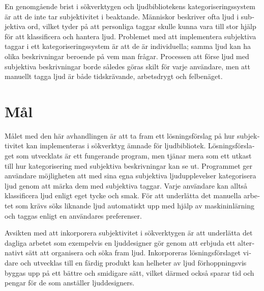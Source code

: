 \begin{otherlanguage}{swedish}
    En genomgående brist i sökverktygen och ljudbibliotekens kategoriseringssystem är att de inte tar subjektivitet i beaktande. Människor beskriver ofta ljud i subjektiva ord, vilket tyder på att personliga taggar skulle kunna vara till stor hjälp för att klassificera och hantera ljud. Problemet med att implementera subjektiva taggar i ett kategoriseringssystem är att de är individuella; samma ljud kan ha olika beskrivningar beroende på vem man frågar. Processen att förse ljud med subjektiva beskrivningar borde således göras skilt för varje användare, men att manuellt tagga ljud är både tidskrävande, arbetsdrygt och felbenäget.

    \section*{Mål}
    Målet med den här avhandlingen är att ta fram ett lösningsförslag på hur subjektivitet kan implementeras i sökverktyg ämnade för ljudbibliotek. Lösningsförslaget som utvecklats är ett fungerande program, men tjänar mera som ett utkast till hur kategorisering med subjektiva beskrivningar kan se ut. Programmet ger användare möjligheten att med sina egna subjektiva ljudupplevelser kategorisera ljud genom att märka dem med subjektiva taggar. Varje användare kan alltså klassificera ljud enligt eget tycke och smak. För att underlätta det manuella arbetet som krävs söks liknande ljud automatiskt upp med hjälp av maskininlärning och taggas enligt en användares preferenser.

    Avsikten med att inkorporera subjektivitet i sökverktygen är att underlätta det dagliga arbetet som exempelvis en ljuddesigner gör genom att erbjuda ett alternativt sätt att organisera och söka fram ljud. Inkorporeras lösningsförslaget vidare och utvecklas till en färdig produkt kan helheter av ljud förhoppningsvis byggas upp på ett bättre och smidigare sätt, vilket därmed också sparar tid och pengar för de som anställer ljuddesigners.


\end{otherlanguage}
